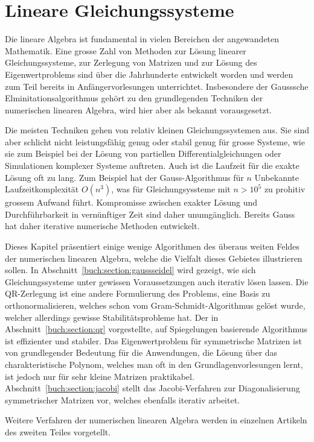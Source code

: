 %
%
%
\chapter{Lineare Gleichungssysteme\label{chapter:linsys}}
\rhead{}
Die lineare Algebra ist fundamental in vielen Bereichen der angewandeten
Mathematik.
Eine grosse Zahl von Methoden zur Lösung linearer
Gleichungssysteme, zur Zerlegung von Matrizen und zur Lösung des
Eigenwertproblems sind über die Jahrhunderte entwickelt worden und
werden zum Teil bereits in Anfängervorlesungen unterrichtet.
Insbesondere der Gausssche Elminitationsalgorithmus gehört zu den
grundlegenden Techniken der numerischen linearen Algebra, wird hier
aber als bekannt vorausgesetzt.

Die meisten Techniken gehen von relativ kleinen Gleichungssystemen aus.
Sie sind aber schlicht nicht leistungsfähig genug oder stabil genug für 
grosse Systeme, wie sie zum Beispiel bei der Lösung von partiellen
Differentialgleichungen oder Simulationen komplexer Systeme auftreten.
Auch ist die Laufzeit für die exakte Lösung oft zu lang.
Zum Beispiel hat der Gauss-Algorithmus für $n$ Unbekannte Laufzeitkomplexität
$O(n^3)$, was für Gleichungsyssteme mit $n>10^5$ zu prohitiv grossem
Aufwand führt.
Kompromisse zwischen exakter Lösung und Durchführbarkeit in vernünftiger
Zeit sind daher unumgänglich.
Bereits Gauss hat daher iterative numerische Methoden entwickelt.

Dieses Kapitel präsentiert einige wenige Algorithmen des überaus weiten
Feldes der numerischen linearen Algebra, welche die Vielfalt dieses
Gebietes illustrieren sollen.
In Abschnitt~\ref{buch:section:gaussseidel} wird gezeigt, wie sich
Gleichungssysteme unter gewissen Voraussetzungen auch iterativ lösen
lassen.
Die QR-Zerlegung ist eine andere Formulierung des Problems, eine Basis
zu orthonormalisieren, welches schon vom Gram-Schmidt-Algorithmus gelöst
wurde, welcher allerdings gewisse Stabilitätsprobleme hat.
Der in Abschnitt~\ref{buch:section:qr} vorgestellte, auf Spiegelungen
basierende Algorithmus ist effizienter und stabiler.
Das Eigenwertproblem für symmetrische Matrizen ist von grundlegender
Bedeutung für die Anwendungen, die Lösung über das charakteristische 
Polynom, welches man oft in den Grundlagenvorlesungen lernt, ist jedoch
nur für sehr kleine Matrizen praktikabel.
Abschnitt~\ref{buch:section:jacobi} stellt das Jacobi-Verfahren zur
Diagonalisierung symmetrischer Matrizen vor, welches ebenfalls iterativ
arbeitet.

Weitere Verfahren der numerischen linearen Algebra werden in einzelnen
Artikeln des zweiten Teiles vorgetellt.









